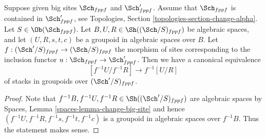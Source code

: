 \begin{lemma}
\label{lemma-quotient-stack-change-big-site}
Suppose given big sites $\Sch_{fppf}$ and $\Sch'_{fppf}$.
Assume that $\Sch_{fppf}$ is contained in $\Sch'_{fppf}$,
see Topologies, Section \ref{topologies-section-change-alpha}.
Let $S \in \Ob(\Sch_{fppf})$.
Let $B, U, R \in \Sh((\Sch/S)_{fppf})$ be algebraic spaces,
and let $(U, R, s, t, c)$ be a groupoid in algebraic spaces over $B$.
Let $f : (\Sch'/S)_{fppf} \to (\Sch/S)_{fppf}$ the morphism
of sites corresponding to the inclusion functor
$u : \Sch_{fppf} \to \Sch'_{fppf}$.
Then we have a canonical equivalence
$$
[f^{-1}U/f^{-1}R]
\longrightarrow
f^{-1}[U/R]
$$
of stacks in groupoids over $(\Sch'/S)_{fppf}$.
\end{lemma}

\begin{proof}
Note that $f^{-1}B, f^{-1}U, f^{-1}R \in \Sh((\Sch'/S)_{fppf})$
are algebraic spaces by
Spaces, Lemma \ref{spaces-lemma-change-big-site}
and hence $(f^{-1}U, f^{-1}R, f^{-1}s, f^{-1}t, f^{-1}c)$
is a groupoid in algebraic spaces over $f^{-1}B$. Thus the statement makes
sense.


\end{proof}
